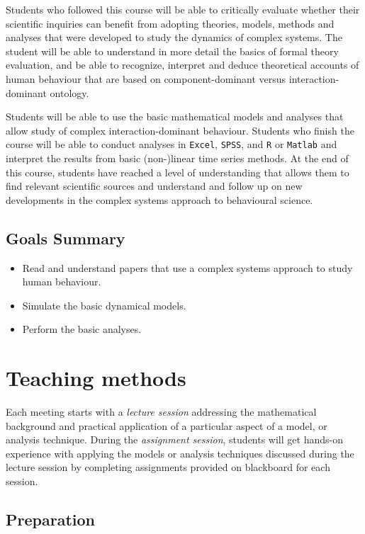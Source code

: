 \documentclass[]{book}
\providecommand{\tightlist}{%
  \setlength{\itemsep}{0pt}\setlength{\parskip}{0pt}}
\let\stdsection\section
\renewcommand\section{\newpage\stdsection}
\begin{document}
Students who followed this course will be able to critically evaluate
whether their scientific inquiries can benefit from adopting theories,
models, methods and analyses that were developed to study the dynamics
of complex systems. The student will be able to understand in more
detail the basics of formal theory evaluation, and be able to recognize,
interpret and deduce theoretical accounts of human behaviour that are
based on component-dominant versus interaction-dominant ontology.

Students will be able to use the basic mathematical models and analyses
that allow study of complex interaction-dominant behaviour. Students who
finish the course will be able to conduct analyses in \texttt{Excel},
\texttt{SPSS}, and \texttt{R} or \texttt{Matlab} and interpret the
results from basic (non-)linear time series methods. At the end of this
course, students have reached a level of understanding that allows them
to find relevant scientific sources and understand and follow up on new
developments in the complex systems approach to behavioural science.

\subsection*{Goals Summary}\label{goals-summary}

\begin{itemize}
\tightlist
\item
  Read and understand papers that use a complex systems approach to
  study human behaviour.
\item
  Simulate the basic dynamical models.
\item
  Perform the basic analyses.
\end{itemize}

\section{Teaching methods}\label{teaching-methods}

Each meeting starts with a \emph{lecture session} addressing the
mathematical background and practical application of a particular aspect
of a model, or analysis technique. During the \emph{assignment session},
students will get hands-on experience with applying the models or
analysis techniques discussed during the lecture session by completing
assignments provided on blackboard for each session.

\subsection*{Preparation}\label{preparation}
\end{document}
